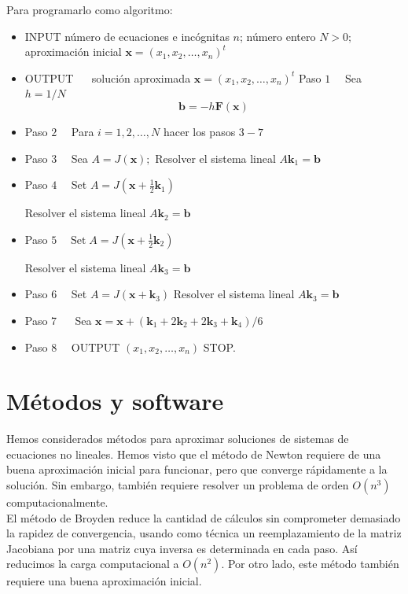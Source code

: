 Para programarlo como algoritmo:
\begin{itemize}
\item INPUT número de ecuaciones e incógnitas $n$; número entero $N>0 ;$ aproximación inicial $\mathbf{x}=\left(x_{1}, x_{2}, \ldots, x_{n}\right)^{t}$
\item OUTPUT $\quad$ solución aproximada $\mathbf{x}=\left(x_{1}, x_{2}, \ldots, x_{n}\right)^{t}$
Paso $1 \quad$ Sea $h=1 / N$
$$
\mathbf{b}=-h \mathbf{F}(\mathbf{x})
$$ 
\item Paso $2 \quad$ Para $i=1,2, \ldots, N$ hacer los pasos $3-7$
\item Paso $3 \quad$ Sea $A=J(\mathbf{x}) ;$
Resolver el sistema lineal $A \mathbf{k}_{1}=\mathbf{b}$
\item Paso $4 \quad$ Set $A=J\left(\mathbf{x}+\frac{1}{2} \mathbf{k}_{1}\right)$

Resolver el sistema lineal $A \mathbf{k}_{2}=\mathbf{b}$ 
\item Paso $5 \quad \operatorname{Set} A=J\left(\mathbf{x}+\frac{1}{2} \mathbf{k}_{2}\right)$

Resolver el sistema lineal $A \mathbf{k}_{3}=\mathbf{b}$
\item Paso $6 \quad$ Set $A=J\left(\mathbf{x}+\mathbf{k}_{3}\right)$
Resolver el sistema lineal $A \mathbf{k}_{3}=\mathbf{b}$ 
\item Paso 7 $\quad$ Sea $\mathbf{x}=\mathbf{x}+\left(\mathbf{k}_{1}+2 \mathbf{k}_{2}+2 \mathbf{k}_{3}+\mathbf{k}_{4}\right) / 6$
\item Paso $8 \quad$ OUTPUT $\left(x_{1}, x_{2}, \ldots, x_{n}\right)$
STOP.

\end{itemize}

\section{Métodos y software}


Hemos considerados métodos para aproximar soluciones de sistemas de ecuaciones no lineales. Hemos visto que el método de Newton requiere de una buena aproximación inicial para funcionar, pero que converge rápidamente a la solución. Sin embargo, también requiere resolver un problema de orden $O(n^3)$ computacionalmente.\\

El método de Broyden reduce la cantidad de cálculos sin comprometer demasiado la rapidez de convergencia, usando como técnica un reemplazamiento de la matriz Jacobiana por una matriz cuya inversa es determinada en cada paso. Así reducimos la carga computacional a $O(n^2)$. Por otro lado, este método también requiere una buena aproximación inicial. \\

